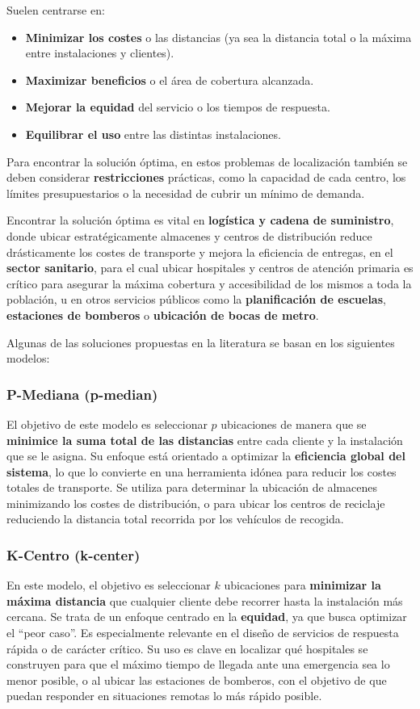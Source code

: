\documentclass[12pt,a4paper]{book}
\begin{document}
Suelen centrarse en:
\begin{itemize}
    \item \textbf{Minimizar los costes} o las distancias (ya sea la distancia total o la máxima entre instalaciones y clientes).
    \item \textbf{Maximizar beneficios} o el área de cobertura alcanzada.
    \item \textbf{Mejorar la equidad} del servicio o los tiempos de respuesta.
    \item \textbf{Equilibrar el uso} entre las distintas instalaciones.
\end{itemize}

Para encontrar la solución óptima, en estos problemas de localización también se deben considerar \textbf{restricciones} prácticas, como la capacidad de cada centro, los límites presupuestarios o la necesidad de cubrir un mínimo de demanda.

Encontrar la solución óptima es vital en \textbf{logística y cadena de suministro}, donde ubicar estratégicamente almacenes y centros
de distribución reduce drásticamente los costes de transporte y mejora la eficiencia de entregas, en el \textbf{sector sanitario}, para el cual ubicar hospitales y centros de atención primaria es crítico para
asegurar la máxima cobertura y accesibilidad de los mismos a toda la población, u en otros servicios públicos como la \textbf{planificación de escuelas}, \textbf{estaciones de bomberos} o \textbf{ubicación de bocas de metro}.

Algunas de las soluciones propuestas en la literatura se basan en los siguientes modelos:

\subsubsection{P-Mediana (p-median)}
El objetivo de este modelo es seleccionar $p$ ubicaciones de manera que se \textbf{minimice la suma total de las distancias} entre cada cliente y la instalación que se le asigna. Su enfoque está orientado a optimizar la \textbf{eficiencia global del sistema}, lo que lo convierte en una herramienta idónea para reducir los costes totales de transporte.
Se utiliza para determinar la ubicación de almacenes minimizando los costes de distribución, o para ubicar los centros de reciclaje reduciendo la distancia total recorrida por los vehículos de recogida.

\subsubsection{K-Centro (k-center)}
En este modelo, el objetivo es seleccionar $k$ ubicaciones para \textbf{minimizar la máxima distancia} que cualquier cliente debe recorrer hasta la instalación más cercana. Se trata de un enfoque centrado en la \textbf{equidad}, ya que busca optimizar el ``peor caso''. Es especialmente relevante en el diseño de servicios de respuesta rápida o de carácter crítico.
Su uso es clave en localizar qué hospitales se construyen para que el máximo tiempo de llegada ante una emergencia sea lo menor posible, o al ubicar las estaciones de bomberos, con el objetivo de que puedan responder
en situaciones remotas lo más rápido posible.
\end{document}
